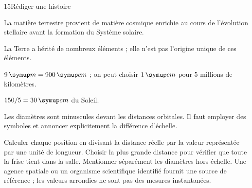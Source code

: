 \par\noindent\begin{minipage}{\linewidth}
\begin{corrige}{15}{Rédiger une histoire}
\begin{questions}
\item La matière terrestre provient de matière cosmique enrichie au cours de l’évolution stellaire avant la formation du Système solaire.
\item La Terre a hérité de nombreux éléments ; elle n’est pas l’origine unique de ces éléments.
\end{questions}
\end{corrige}
\end{minipage}
\par\noindent\begin{minipage}{\linewidth}
\label{cor-defi-8}\begin{questions}
\item $9\unite m=900\unite{cm}$ ; on peut choisir $1\unite{cm}$ pour $5$ millions de kilomètres.
\item $150/5=30\unite{cm}$ du Soleil.
\item Les diamètres sont minuscules devant les distances orbitales. Il faut employer des symboles et annoncer explicitement la différence d’échelle.
\end{questions}
\end{minipage}
\par\noindent\begin{minipage}{\linewidth}
\label{cor-activite-8}
Calculer chaque position en divisant la distance réelle par la valeur représentée par une unité de longueur. Choisir la plus grande distance pour vérifier que toute la frise tient dans la salle. Mentionner séparément les diamètres hors échelle. Une agence spatiale ou un organisme scientifique identifié fournit une source de référence ; les valeurs arrondies ne sont pas des mesures instantanées.\par\end{minipage}
